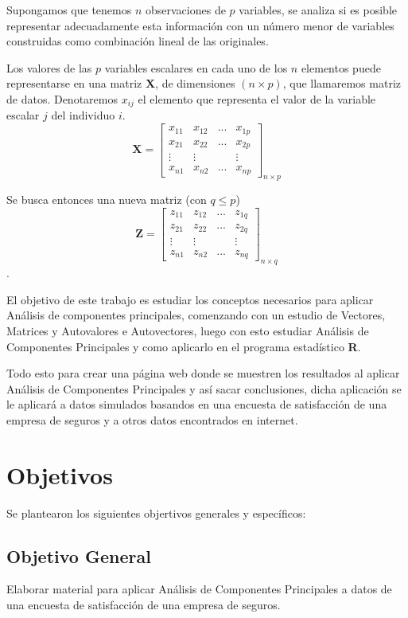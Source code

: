 \documentclass[12pt,letterpaper]{report} %
\begin{document}
Supongamos que tenemos $n$ observaciones de $p$ variables, se analiza si es posible representar adecuadamente esta información con un número menor de variables construidas como combinación lineal de las originales.

Los valores de las $p$ variables escalares en cada uno de los $n$ elementos puede representarse en una matriz $\mathbf{X}$, de dimensiones $(n \times p)$, que llamaremos matriz de datos. Denotaremos $x_{ij}$ el elemento que representa el valor de la variable escalar ${j}$ del individuo ${i}$.
$$
\mathbf{X}=\begin{bmatrix}
x_{11} & x_{12} & ... & x_{1p} \\
x_{21} & x_{22} & ... & x_{2p} \\
\vdots & \vdots &   & \vdots \\
x_{n1} & x_{n2} & ... & x_{np}
\end{bmatrix}_{n\times p}
$$

Se busca entonces una nueva matriz (con $q\le p$)
$$
\mathbf{Z}=\begin{bmatrix}
z_{11} & z_{12} & ... & z_{1q} \\
z_{21} & z_{22} & ... & z_{2q} \\
\vdots & \vdots &   & \vdots \\
z_{n1} & z_{n2} & ... & z_{nq}
\end{bmatrix}_{n\times q}
$$.

El objetivo de este trabajo es estudiar los conceptos necesarios para aplicar Análisis de componentes principales, comenzando con un estudio de Vectores, Matrices y Autovalores e Autovectores, luego con esto estudiar Análisis de Componentes Principales y como aplicarlo en el programa estadístico \textbf{R}.

Todo esto para crear una página web donde se muestren los resultados al aplicar Análisis de Componentes Principales y así sacar conclusiones, dicha aplicación se le aplicará a datos simulados basandos en una encuesta de satisfacción de una empresa de seguros y a otros datos encontrados en internet.

\section{Objetivos}
Se plantearon los siguientes objertivos generales y específicos:

\subsection{Objetivo General}
Elaborar material para aplicar Análisis de Componentes Principales a datos de una encuesta de satisfacción de una empresa de seguros.
\end{document}
